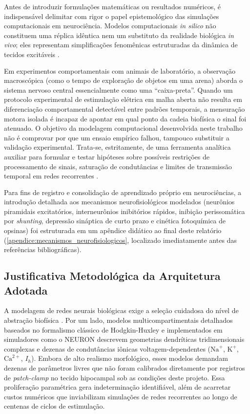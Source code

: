 \documentclass[11pt,a4paper,article,brazil]{abntex2}
\begin{document}
Antes de introduzir formulações matemáticas ou resultados numéricos, é indispensável delimitar com rigor o papel epistemológico das simulações computacionais em neurociência. Modelos computacionais \emph{in silico} não constituem uma réplica idêntica nem um substituto da realidade biológica \emph{in vivo}; eles representam simplificações fenomênicas estruturadas da dinâmica de tecidos excitáveis \cite{dayan2001, gerstner2014}.

Em experimentos comportamentais com animais de laboratório, a observação macroscópica (como o tempo de exploração de objetos em uma arena) aborda o sistema nervoso central essencialmente como uma ``caixa-preta''. Quando um protocolo experimental de estimulação elétrica em malha aberta não resulta em diferenciação comportamental detectável entre padrões temporais, a mensuração motora isolada é incapaz de apontar em qual ponto da cadeia biofísica o sinal foi atenuado. O objetivo da modelagem computacional desenvolvida neste trabalho não é comprovar por que um ensaio empírico falhou, tampouco substituir a validação experimental. Trata-se, estritamente, de uma ferramenta analítica auxiliar para formular e testar hipóteses sobre possíveis restrições de processamento de sinais, saturação de condutâncias e limites de transmissão temporal em redes recorrentes \cite{dayan2001, buzsaki2006}.

Para fins de registro e consolidação de aprendizado próprio em neurociências, a introdução detalhada aos mecanismos neurofisiológicos modelados (neurônios piramidais excitatórios, interneurônios inibitórios rápidos, inibição perissomática por \emph{shunting}, depressão sináptica de curto prazo e cinética fotoquímica de opsinas) foi estruturada em um apêndice didático ao final deste relatório (\cref{apendice:mecanismos_neurofisiologicos}, localizado imediatamente antes das referências bibliográficas).

\subsection{Justificativa Metodológica da Arquitetura Adotada}

A modelagem de redes neurais biológicas exige a seleção cuidadosa do nível de abstração biofísica \cite{dayan2001, gerstner2014}. Por um lado, modelos multicompartimentais detalhados baseados no formalismo clássico de Hodgkin-Huxley \cite{hodgkin1952} e implementados em simuladores como o \textsf{NEURON} descrevem geometrias dendríticas tridimensionais complexas e dezenas de condutâncias iônicas voltagem-dependentes ($\text{Na}^+$, $\text{K}^+$, $\text{Ca}^{2+}$, $I_h$). Embora de alto realismo morfológico, esses modelos demandam dezenas de parâmetros livres que não foram calibrados diretamente por registros de \emph{patch-clamp} no tecido hipocampal sob as condições deste projeto. Essa proliferação paramétrica gera indeterminação identifiável, além de acarretar custos numéricos que inviabilizam simulações de redes recorrentes ao longo de centenas de ciclos de estimulação.
\end{document}
